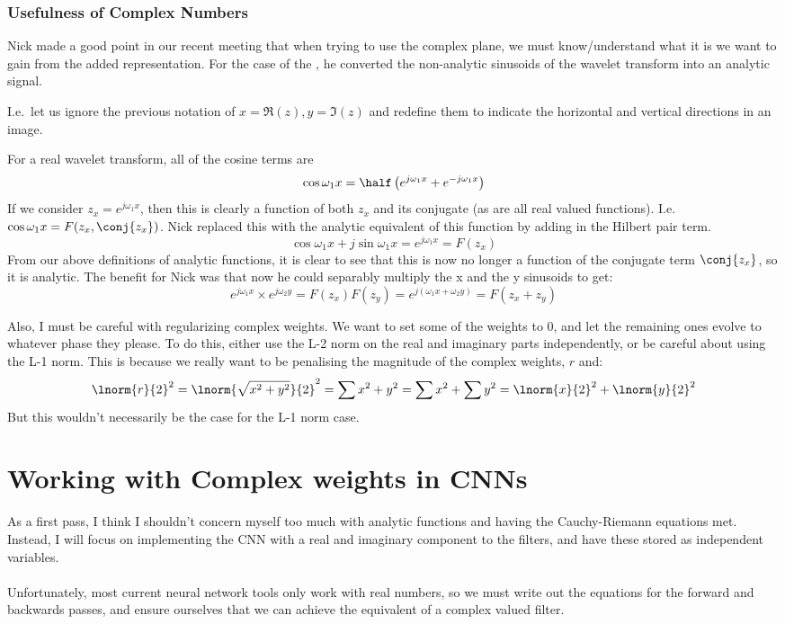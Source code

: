 \subsubsection*{Usefulness of Complex Numbers}
  Nick made a good point in our recent meeting that when trying to use the
  complex plane, we must know/understand what it is we want to gain from the
  added representation. For the case of the \DTCWT, he converted the non-analytic
  sinusoids of the wavelet transform into an analytic signal.

  I.e.\ let us ignore the previous notation of $x=\Re(z), y=\Im(z)$ and redefine
  them to indicate the horizontal and vertical directions in an image.

  For a real wavelet transform, all of the cosine terms are
  $$\cos \omega_1 x = \half\left(e^{j\omega_1 x} + e^{-j\omega_1 x} \right)$$
  If we consider $z_x = e^{j\omega_1 x}$, then this is clearly a function of both
  $z_x$ and its conjugate (as are all real valued functions). I.e. $\cos \omega_1
  x = F(z_x,\conj{z_x})$. Nick replaced this with the analytic equivalent of this
  function by adding in the Hilbert pair term.
  $$\cos \omega_1 x +j \sin \omega_1 x = e^{j\omega_1 x} = F(z_x)$$
  From our above definitions of analytic functions, it is clear to see that this
  is now no longer a function of the conjugate term $\conj{z_x}$, so it is analytic. The
  benefit for Nick was that now he could separably multiply the x and the
  y sinusoids to get:
  $$e^{j\omega_1 x} \times e^{j\omega_2 y} =F(z_x)F(z_y)= e^{j(\omega_1 x + \omega_2 y)}
  = F(z_x+z_y)$$

  Also, I must be careful with regularizing complex weights. We want to set some
  of the weights to 0, and let the remaining ones evolve to whatever phase they
  please. To do this, either use the L-2 norm on the real and imaginary parts
  independently, or be careful about using the L-1 norm. This is because we
  really want to be penalising the magnitude of the complex weights, $r$ and: 
  $$\lnorm{r}{2}^2 = \lnorm{\sqrt{x^2+y^2}}{2}^2 = \sum x^2 + y^2 = \sum x^2 + \sum y^2
  = \lnorm{x}{2}^2 + \lnorm{y}{2}^2$$
  But this wouldn't necessarily be the case for the L-1 norm case.

\section*{Working with Complex weights in CNNs}
  As a first pass, I think I shouldn't concern myself too much with analytic
  functions and having the Cauchy-Riemann equations met. Instead, I will focus
  on implementing the CNN with a real and imaginary component to the filters,
  and have these stored as independent variables.\\\\
  Unfortunately, most current neural network tools only work with real numbers,
  so we must write out the equations for the forward and backwards passes, and
  ensure ourselves that we can achieve the equivalent of a complex valued
  filter.
